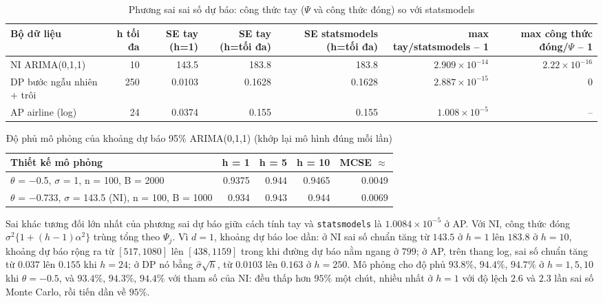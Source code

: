 \begin{table}[H]
\centering\footnotesize
\caption{Phương sai sai số dự báo: công thức tay ($\Psi$ và công thức đóng) so với statsmodels}\label{tab:tab_b12_08_forecast_variance}
\begin{adjustbox}{max width=\linewidth}
\begin{tabular}{|l|r|r|r|r|r|r|}
\toprule
Bộ dữ liệu & h tối đa & SE tay (h=1) & SE tay (h=tối đa) & SE statsmodels (h=tối đa) & max \textbar{}tay/statsmodels – 1\textbar{} & max \textbar{}công thức đóng/$\Psi$ – 1\textbar{} \\
\midrule
NI ARIMA(0,1,1) & 10 & 143.5 & 183.8 & 183.8 & $2.909\times10^{-14}$ & $2.22\times10^{-16}$ \\
DP bước ngẫu nhiên + trôi & 250 & 0.0103 & 0.1628 & 0.1628 & $2.887\times10^{-15}$ & 0 \\
AP airline (log) & 24 & 0.0374 & 0.155 & 0.155 & $1.008\times10^{-5}$ & – \\
\bottomrule
\end{tabular}
\end{adjustbox}
\end{table}
\begin{table}[H]
\centering\footnotesize
\caption{Độ phủ mô phỏng của khoảng dự báo 95\% ARIMA(0,1,1) (khớp lại mô hình đúng mỗi lần)}\label{tab:tab_b12_08_coverage}
\begin{adjustbox}{max width=\linewidth}
\begin{tabular}{|>{\raggedright\arraybackslash}p{}|r|r|r|r|}
\toprule
Thiết kế mô phỏng & h = 1 & h = 5 & h = 10 & MCSE $\approx$ \\
\midrule
$\theta$ = $-$0.5, $\sigma$ = 1, n = 100, B = 2000 & 0.9375 & 0.944 & 0.9465 & 0.0049 \\[3pt]
$\theta$ = $-$0.733, $\sigma$ = 143.5 (NI), n = 100, B = 1000 & 0.934 & 0.943 & 0.944 & 0.0069 \\[3pt]
\bottomrule
\end{tabular}
\end{adjustbox}
\end{table}
 Sai khác tương đối lớn nhất của phương sai dự báo giữa cách tính tay và \texttt{statsmodels} là $1.0084\times10^{-5}$ ở AP. Với NI, công thức đóng $\sigma^2\{1+(h-1)\alpha^2\}$ trùng tổng theo $\Psi_j$. Vì $d=1$, khoảng dự báo loe dần: ở NI sai số chuẩn tăng từ $143.5$ ở $h=1$ lên $183.8$ ở $h=10$, khoảng dự báo rộng ra từ $[517,1080]$ lên $[438,1159]$ trong khi đường dự báo nằm ngang ở $799$; ở AP, trên thang log, sai số chuẩn tăng từ $0.037$ lên $0.155$ khi $h=24$; ở DP nó bằng $\hat\sigma\sqrt h$, từ $0.0103$ lên $0.163$ ở $h=250$. Mô phỏng cho độ phủ $93.8\%$, $94.4\%$, $94.7\%$ ở $h=1,5,10$ khi $\theta=-0.5$, và $93.4\%$, $94.3\%$, $94.4\%$ với tham số của NI: đều thấp hơn $95\%$ một chút, nhiều nhất ở $h=1$ với độ lệch $2.6$ và $2.3$ lần sai số Monte Carlo, rồi tiến dần về $95\%$.

